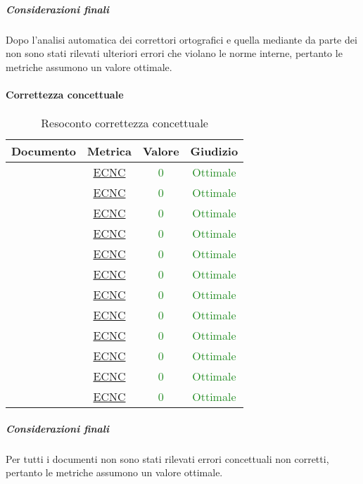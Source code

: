 					\subparagraph{Considerazioni finali}
					Dopo l'analisi automatica dei correttori ortografici e quella mediante  da parte dei \verificatori{} non sono stati rilevati ulteriori errori che violano le norme interne, pertanto le metriche assumono un valore ottimale.
					
				\paragraph{Correttezza concettuale}
				\begin{table}[H]
					\centering
					\small
					\begin{tabular}{c | c | c | c}
						\hline
						\textbf{Documento} & \textbf{Metrica} & \textbf{Valore} & \textbf{Giudizio} \\
						\hline
						\pdpv & \hyperref[MCC]{ECNC} & \textcolor{ForestGreen}{0} & \textcolor{ForestGreen}{Ottimale} \\
						\pdqv & \hyperref[MCC]{ECNC} & \textcolor{ForestGreen}{0} & \textcolor{ForestGreen}{Ottimale}\\
						\ndpv & \hyperref[MCC]{ECNC} &\textcolor{ForestGreen}{0} & \textcolor{ForestGreen}{Ottimale}\\
						\sdfv & \hyperref[MCC]{ECNC} & \textcolor{ForestGreen}{0} & \textcolor{ForestGreen}{Ottimale}\\
						\adrv & \hyperref[MCC]{ECNC} & \textcolor{ForestGreen}{0} & \textcolor{ForestGreen}{Ottimale}\\
						\glv  & \hyperref[MCC]{ECNC} & \textcolor{ForestGreen}{0} & \textcolor{ForestGreen}{Ottimale}\\
						\vunoi& \hyperref[MCC]{ECNC} & \textcolor{ForestGreen}{0} & \textcolor{ForestGreen}{Ottimale}\\
						\vduei& \hyperref[MCC]{ECNC} & \textcolor{ForestGreen}{0} & \textcolor{ForestGreen}{Ottimale}\\
						\vtrei & \hyperref[MCC]{ECNC} & \textcolor{ForestGreen}{0} & \textcolor{ForestGreen}{Ottimale}\\
						\vquattroi & \hyperref[MCC]{ECNC} & \textcolor{ForestGreen}{0} & \textcolor{ForestGreen}{Ottimale}\\
						\vunoe & \hyperref[MCC]{ECNC} & \textcolor{ForestGreen}{0} & \textcolor{ForestGreen}{Ottimale}\\
						\vduee & \hyperref[MCC]{ECNC} & \textcolor{ForestGreen}{0} & \textcolor{ForestGreen}{Ottimale}\\
						\hline
					\end{tabular}
					\caption{Resoconto correttezza concettuale}
					\label{tab_resoconto_correttezza_concettuale}
				\end{table}
				
				\subparagraph{Considerazioni finali}
					Per tutti i documenti non sono stati rilevati errori concettuali non corretti, pertanto le metriche assumono un valore ottimale.
					
				
				
					